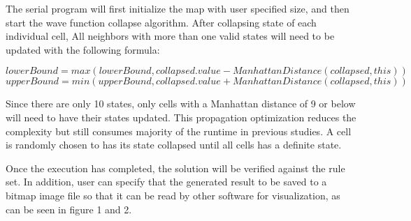 The serial program will first initialize the map with user specified size, and then start the wave function collapse algorithm. After collapsing state of each individual cell, All neighbors with more than one valid states will need to be updated with the following formula:

\[
lowerBound = max(lowerBound, collapsed.value - ManhattanDistance(collapsed, this))
\]
\[
upperBound = min(upperBound, collapsed.value + ManhattanDistance(collapsed, this))
\]

Since there are only 10 states, only cells with a Manhattan distance of 9 or below will need to have their states updated. This propagation optimization reduces the complexity but still consumes majority of the runtime in previous studies. A cell is randomly chosen to has its state collapsed until all cells has a definite state. 

Once the execution has completed, the solution will be verified against the rule set. In addition, user can specify that the generated result to be saved to a bitmap image file so that it can be read by other software for visualization, as can be seen in figure 1 and 2.